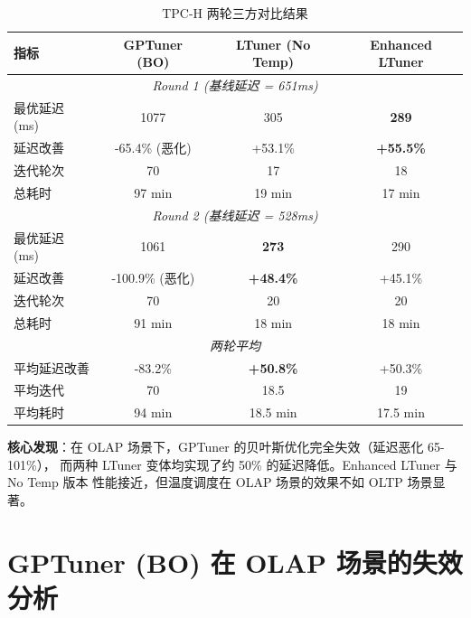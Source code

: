 \begin{table}[h]
\centering
\caption{TPC-H 两轮三方对比结果}
\label{tab:tpch-results}
\begin{tabular}{l|ccc}
\hline
\textbf{指标} & \textbf{GPTuner (BO)} & \textbf{LTuner (No Temp)} & \textbf{Enhanced LTuner} \\
\hline
\multicolumn{4}{c}{\textit{Round 1 (基线延迟 = 651ms)}} \\
\hline
最优延迟 (ms)    & 1077      & 305       & \textbf{289}      \\
延迟改善          & -65.4\% (恶化) & +53.1\%   & \textbf{+55.5\%}  \\
迭代轮次          & 70        & 17        & 18                \\
总耗时            & 97 min    & 19 min    & 17 min            \\
\hline
\multicolumn{4}{c}{\textit{Round 2 (基线延迟 = 528ms)}} \\
\hline
最优延迟 (ms)    & 1061      & \textbf{273}       & 290      \\
延迟改善          & -100.9\% (恶化) & \textbf{+48.4\%}   & +45.1\%  \\
迭代轮次          & 70        & 20        & 20                \\
总耗时            & 91 min    & 18 min    & 18 min            \\
\hline
\multicolumn{4}{c}{\textit{两轮平均}} \\
\hline
平均延迟改善      & -83.2\%   & \textbf{+50.8\%}   & +50.3\%  \\
平均迭代          & 70        & 18.5      & 19                \\
平均耗时          & 94 min    & 18.5 min  & 17.5 min          \\
\hline
\end{tabular}
\end{table}

\textbf{核心发现}：在 OLAP 场景下，GPTuner 的贝叶斯优化完全失效（延迟恶化 65-101\%），
而两种 LTuner 变体均实现了约 50\% 的延迟降低。Enhanced LTuner 与 No Temp 版本
性能接近，但温度调度在 OLAP 场景的效果不如 OLTP 场景显著。



\section{GPTuner (BO) 在 OLAP 场景的失效分析}

